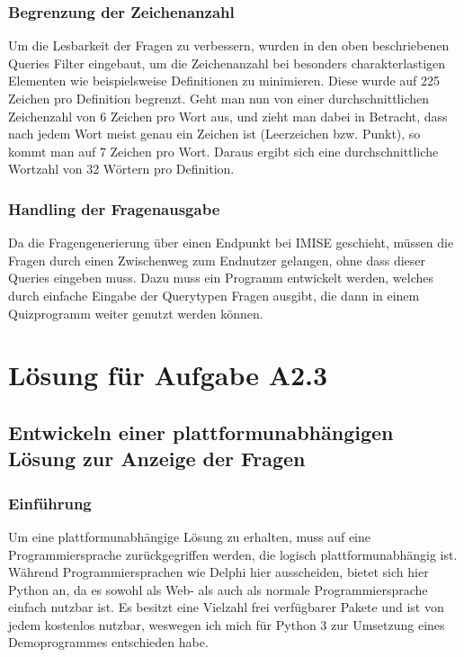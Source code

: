\documentclass[headsepline,titlepage,ngerman,twoside,12pt]{report}
\begin{document}
\subsubsection{Begrenzung der Zeichenanzahl}
Um die Lesbarkeit der Fragen zu verbessern, wurden in den oben beschriebenen Queries Filter eingebaut, um die Zeichenanzahl bei besonders charakterlastigen Elementen wie beispielsweise Definitionen zu minimieren.
Diese wurde auf 225 Zeichen pro Definition begrenzt.
Geht man nun von einer durchschnittlichen Zeichenzahl von 6 Zeichen pro Wort aus, und zieht man dabei in Betracht, dass nach jedem Wort meist genau ein Zeichen ist (Leerzeichen bzw. Punkt), so kommt man auf 7 Zeichen pro Wort.
Daraus ergibt sich eine durchschnittliche Wortzahl von 32 Wörtern pro Definition.

\subsubsection{Handling der Fragenausgabe}
Da die Fragengenerierung über einen Endpunkt bei IMISE geschieht, müssen die Fragen durch einen Zwischenweg zum Endnutzer gelangen, ohne dass dieser Queries eingeben muss.
Dazu muss ein Programm entwickelt werden, welches durch einfache Eingabe der Querytypen Fragen ausgibt, die dann in einem Quizprogramm weiter genutzt werden können.

\section{Lösung für Aufgabe A2.3}

\subsection{Entwickeln einer plattformunabhängigen Lösung zur Anzeige der Fragen}

\subsubsection{Einführung}

Um eine plattformunabhängige Lösung zu erhalten, muss auf eine Programmiersprache zurückgegriffen werden, die logisch plattformunabhängig ist.
Während Programmiersprachen wie Delphi hier ausscheiden, bietet sich hier Python an, da es sowohl als Web- als auch als normale Programmiersprache einfach nutzbar ist.
Es besitzt eine Vielzahl frei verfügbarer Pakete und ist von jedem kostenlos nutzbar, weswegen ich mich für Python 3 zur Umsetzung eines Demoprogrammes entschieden habe.
\end{document}

